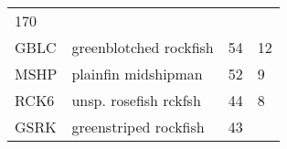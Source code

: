 \documentclass[]{article}
\begin{document}
\begin{longtable}[c]{@{}llll@{}}
\begin{minipage}[t]{0.23\columnwidth}
170
\end{minipage}
\\\addlinespace
\begin{minipage}[t]{0.08\columnwidth}\raggedright
GBLC
\end{minipage} & \begin{minipage}[t]{0.36\columnwidth}\raggedright
greenblotched rockfish
\end{minipage} & \begin{minipage}[t]{0.21\columnwidth}\raggedright
54
\end{minipage} & \begin{minipage}[t]{0.23\columnwidth}\raggedright
12
\end{minipage}
\\\addlinespace
\begin{minipage}[t]{0.08\columnwidth}\raggedright
MSHP
\end{minipage} & \begin{minipage}[t]{0.36\columnwidth}\raggedright
plainfin midshipman
\end{minipage} & \begin{minipage}[t]{0.21\columnwidth}\raggedright
52
\end{minipage} & \begin{minipage}[t]{0.23\columnwidth}\raggedright
9
\end{minipage}
\\\addlinespace
\begin{minipage}[t]{0.08\columnwidth}\raggedright
RCK6
\end{minipage} & \begin{minipage}[t]{0.36\columnwidth}\raggedright
unsp. rosefish rckfsh
\end{minipage} & \begin{minipage}[t]{0.21\columnwidth}\raggedright
44
\end{minipage} & \begin{minipage}[t]{0.23\columnwidth}\raggedright
8
\end{minipage}
\\\addlinespace
\begin{minipage}[t]{0.08\columnwidth}\raggedright
GSRK
\end{minipage} & \begin{minipage}[t]{0.36\columnwidth}\raggedright
greenstriped rockfish
\end{minipage} & \begin{minipage}[t]{0.21\columnwidth}\raggedright
43
\end{minipage} & \begin{minipage}[t]{0.23\columnwidth}\raggedright

\end{minipage}
\end{longtable}
\end{document}
